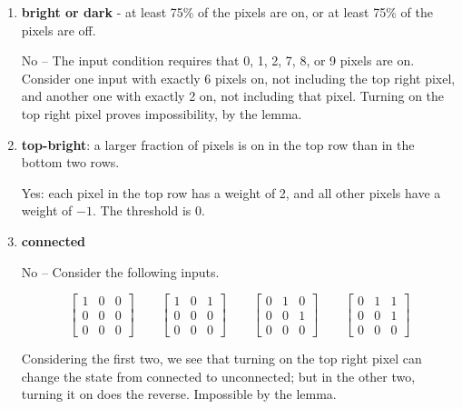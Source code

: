 \documentclass{article}
\newcommand{\mat}[1]{\begin{bmatrix}#1\end{bmatrix}}
\begin{document}
  \begin{enumerate}
  \item \textbf{bright or dark} - at least 75\% of the pixels are on,
    or at least 75\% of the pixels are off.

    No -- The input condition requires that 0, 1, 2, 7, 8, or 9 pixels
    are on. Consider one input with exactly 6 pixels on, not including
    the top right pixel, and another one with exactly 2 on, not
    including that pixel. Turning on the top right pixel proves
    impossibility, by the lemma.

  \item \textbf{top-bright}: a larger fraction of pixels is on in the
    top row than in the bottom two rows.

    Yes: each pixel in the top row has a weight of 2, and all other
    pixels have a weight of $-1$. The threshold is 0.


  \item \textbf{connected}

    No -- Consider the following inputs.

    \[\mat{1&0&0\\0&0&0\\0&0&0}\qquad\mat{1&0&1\\0&0&0\\0&0&0}\qquad\mat{0&1&0\\0&0&1\\0&0&0}\qquad\mat{0&1&1\\0&0&1\\0&0&0}\]

    Considering the first two, we see that turning on the top right
    pixel can change the state from connected to unconnected; but in
    the other two, turning it on does the reverse. Impossible by the
    lemma.
  \end{enumerate}
\end{document}

